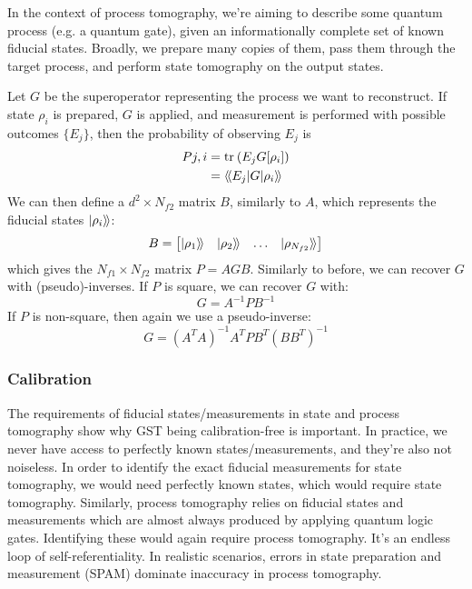In the context of process tomography, we're aiming to describe some quantum process (e.g. a quantum
gate), given an informationally complete set of known fiducial states. Broadly,
we prepare many copies of them, pass them through the target process, and perform state tomography
on the output states.

Let $G$ be the superoperator representing the process we want to reconstruct. If state $\rho_i$ is
prepared, $G$ is applied, and measurement is performed with possible outcomes $\{E_j\}$, then the
probability of observing $E_j$ is
\begin{equation}
    \begin{aligned}
        P{j,i} &= \text{tr}_{}\left(E_j G[\rho_i]\right) \\
               &= \langle\!\braket{E_j | G | \rho_i}\!\rangle
    \end{aligned}
\end{equation}
We can then define a $d^2 \times N_{f2}$ matrix $B$, similarly to $A$, which represents the fiducial
states $\ket{\rho_i}\!\rangle$:
\begin{equation}
    B = 
    \begin{bmatrix}
        \ket{\rho_1}\!\rangle & \ket{\rho_2}\!\rangle & \dots & \ket{\rho_{N_{f2}}}\!\rangle
    \end{bmatrix}
\end{equation}
which gives the $N_{f1} \times N_{f2}$ matrix $P = AGB$. Similarly to before, we can recover $G$
with (pseudo)-inverses. If $P$ is square, we can recover $G$ with:
\begin{equation}
    G = A^{-1} P B^{-1}
\end{equation}
If $P$ is non-square, then again we use a pseudo-inverse:
\begin{equation}
    G = (A^T A)^{-1} A^T P B^T (B B^T)^{-1}
\end{equation}

\subsubsection{Calibration}

The requirements of fiducial states/measurements in state and process tomography show why GST being
calibration-free is important. In practice, we never have access to perfectly known
states/measurements, and they're also not noiseless. In order to identify the exact fiducial
measurements for state tomography, we would need perfectly known states, which would require state
tomography.  Similarly, process tomography relies on fiducial states and measurements which are
almost always produced by applying quantum logic gates. Identifying these would again require
process tomography. It's an endless loop of self-referentiality. In realistic scenarios, errors in
state preparation and measurement (SPAM) dominate inaccuracy in process tomography.

